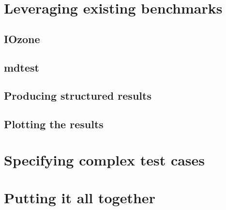 
\section{Leveraging existing benchmarks}


\subsection{IOzone}


\subsection{mdtest}





\subsection{Producing structured results}



\subsection{Plotting the results}





\section{Specifying complex test cases}




\section{Putting it all together}



